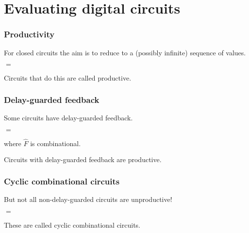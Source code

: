 \section{Evaluating digital circuits}

\begin{frame}
    \frametitle{Productivity}

    For \alert{closed circuits} the aim is to reduce to a (\alert{possibly infinite}) sequence of values.        

    \pause

    \begin{center}
        \quad\(=\)\quad
    \end{center}


    \pause

    Circuits that do this are called \alert{productive}.

\end{frame}

\begin{frame}
    \frametitle{Delay-guarded feedback}

    Some circuits have \alert{delay-guarded feedback}.

    \pause

    \begin{center}
        \quad\(=\)\quad
    \end{center}

    where \(\hat{F}\) is combinational.

    \pause

    \vspace{1em}

    \begin{theorem}
        Circuits with delay-guarded feedback are productive.
    \end{theorem}

\end{frame}

\begin{frame}
    \frametitle{Cyclic combinational circuits}

    But not all non-delay-guarded circuits are unproductive!
    
    \pause

    \begin{center}
        \pause
        \quad\(=\)\quad
    \end{center}

    \pause

    These are called \alert{cyclic combinational circuits}.

\end{frame}

